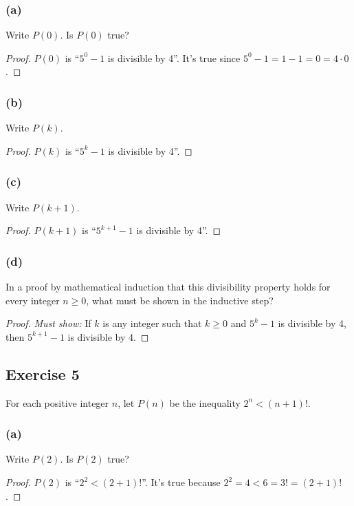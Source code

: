 \documentclass[14pt]{extarticle}
\begin{document}
\subsubsection{(a)}
Write $P(0)$. Is $P(0)$ true?

\begin{proof}
$P(0)$ is ``$5^0 - 1$ is divisible by 4''. It's true since $5^0 - 1 = 1 - 1 = 0 = 4 \cdot 0$.
\end{proof}

\subsubsection{(b)}
Write $P(k)$.

\begin{proof}
$P(k)$ is ``$5^k - 1$ is divisible by 4''.
\end{proof}

\subsubsection{(c)}
Write $P(k + 1)$.

\begin{proof}
$P(k+1)$ is ``$5^{k+1} - 1$ is divisible by 4''.
\end{proof}

\subsubsection{(d)}
In a proof by mathematical induction that this divisibility property holds for every integer $n \geq 0$, what must be shown in the inductive step?

\begin{proof}
{\it Must show:} If $k$ is any integer such that $k \geq 0$ and $5^k - 1$ is divisible by 4, then $5^{k+1} - 1$ is divisible by 4.
\end{proof}

\subsection{Exercise 5}
For each positive integer $n$, let $P(n)$ be the inequality
$2^n < (n + 1)!$.

\subsubsection{(a)}
Write $P(2)$. Is $P(2)$ true?

\begin{proof}
$P(2)$ is ``$2^2 < (2+1)!$''. It's true because $2^2 = 4 < 6 = 3! = (2+1)!$.
\end{proof}
\end{document}
